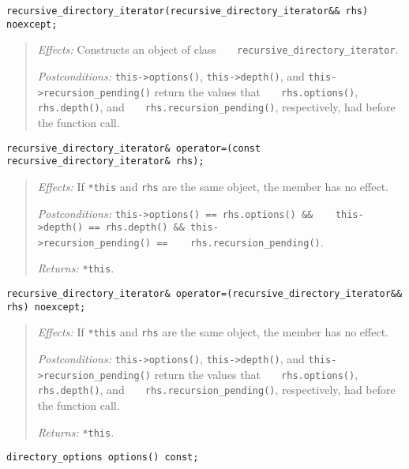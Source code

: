 \begin{verbatim}
recursive_directory_iterator(recursive_directory_iterator&& rhs) noexcept;
\end{verbatim}

\begin{quote}
\emph{Effects:} Constructs an object of class
\texttt{\ \ \ recursive\_directory\_iterator}.

\emph{Postconditions:} \texttt{this-\textgreater{}options()},
\texttt{this-\textgreater{}depth()}, and
\texttt{this-\textgreater{}recursion\_pending()} return the values that
\texttt{\ \ \ rhs.options()}, \texttt{rhs.depth()}, and
\texttt{\ \ \ rhs.recursion\_pending()}, respectively, had before the
function call.
\end{quote}

\begin{verbatim}
recursive_directory_iterator& operator=(const recursive_directory_iterator& rhs);
\end{verbatim}

\begin{quote}
\emph{Effects:} If \texttt{*this} and \texttt{rhs} are the same object,
the member has no effect.

\emph{Postconditions:}
\texttt{this-\textgreater{}options()\ ==\ rhs.options()\ \&\&\ \ \ \ this-\textgreater{}depth()\ ==\ rhs.depth()\ \&\&\ this-\textgreater{}recursion\_pending()\ ==\ \ \ \ rhs.recursion\_pending()}.

\emph{Returns:} \texttt{*this}.
\end{quote}

\begin{verbatim}
recursive_directory_iterator& operator=(recursive_directory_iterator&& rhs) noexcept;
\end{verbatim}

\begin{quote}
\emph{Effects:} If \texttt{*this} and \texttt{rhs} are the same object,
the member has no effect.

\emph{Postconditions:} \texttt{this-\textgreater{}options()},
\texttt{this-\textgreater{}depth()}, and
\texttt{this-\textgreater{}recursion\_pending()} return the values that
\texttt{\ \ \ rhs.options()}, \texttt{rhs.depth()}, and
\texttt{\ \ \ rhs.recursion\_pending()}, respectively, had before the
function call.

\emph{Returns:} \texttt{*this}.
\end{quote}

\begin{verbatim}
directory_options options() const;
\end{verbatim}


